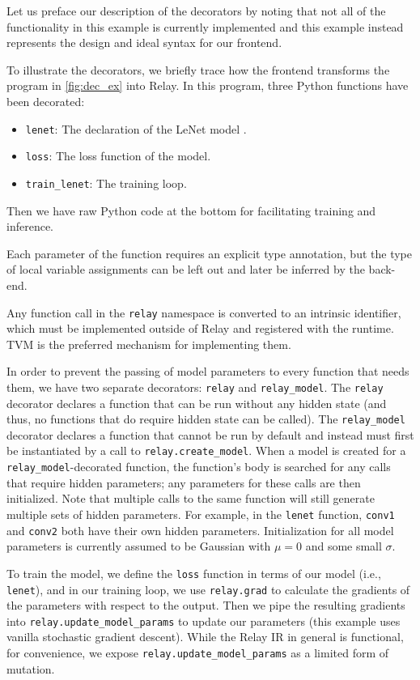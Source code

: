 Let us preface our description of the decorators by noting that not all of the
functionality in this example is currently implemented and this example instead
represents the design and ideal syntax for our frontend.

To illustrate the decorators, we briefly trace how the frontend transforms the
program in \ref{fig:dec_ex} into Relay.
In this program, three Python functions have been decorated:
\begin{itemize}
  \item \texttt{lenet}: The declaration of the LeNet model \cite{lenet}.
  \item \texttt{loss}: The loss function of the model.
  \item \texttt{train\_lenet}: The training loop.
\end{itemize}
Then we have raw Python code at the bottom for facilitating training and
inference.

Each parameter of the function requires an explicit type annotation, but
the type of local variable assignments can be left out and later be inferred
by the back-end.

Any function call in the \texttt{relay} namespace is converted to an intrinsic
identifier, which must be implemented outside of Relay and registered with the
runtime. TVM is the preferred mechanism for implementing them.

In order to prevent the passing of model parameters to every function that needs
them, we have two separate decorators: \texttt{relay} and
\texttt{relay\_model}. The \texttt{relay} decorator declares a function that
can be run without any hidden state (and thus, no functions that do require hidden
state can be called). The \texttt{relay\_model} decorator declares a function
that cannot be run by default and instead must first be instantiated by a call to
\texttt{relay.create\_model}. When a model is created for a
\texttt{relay\_model}-decorated function, the function's body is searched for any
calls that require hidden parameters; any parameters for these calls are then initialized.
Note that multiple calls to the same function will still generate multiple sets of
hidden parameters. For example, in the \texttt{lenet} function, \texttt{conv1}
and \texttt{conv2} both have their own hidden parameters. Initialization for all
model parameters is currently assumed to be Gaussian with $\mu = 0$ and some
small $\sigma$.

To train the model, we define the \texttt{loss} function in terms of our model
(i.e., \texttt{lenet}), and in our training loop, we use \texttt{relay.grad} to
calculate the gradients of the parameters with respect to the output. Then we
pipe the resulting gradients into \texttt{relay.update\_model\_params} to update
our parameters (this example uses vanilla stochastic gradient descent).
While the Relay IR in general is functional, for convenience, we expose
\texttt{relay.update\_model\_params} as a limited form of mutation.

